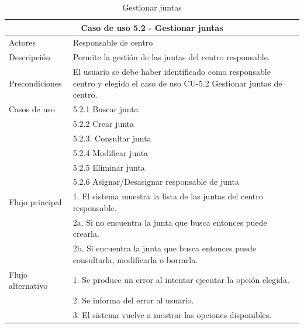 \begin{table}[H]
    \caption{Gestionar juntas}
    \label{tab:CU-5.2}
    \begin{center}
        \begin{tabular}{|l|p{12cm}|}
            \hline
            \multicolumn{2}{|c|}{Caso de uso 5.2 - Gestionar juntas} \\
            \hline \hline
            Actores                 &   Responsable de centro          \\  
            \hline
            Descripción             &   Permite la gestión de las juntas del centro responsable. \\  \hline
            Precondiciones          &   El usuario se debe haber identificado como responsable centro y elegido el caso de uso CU-5.2 Gestionar juntas de centro. \\  \hline
            Casos de uso            & 
            5.2.1 Buscar junta \\ 
            &
            5.2.2 Crear junta \\ 
            & 
            5.2.3. Consultar junta\\ 
            & 
            5.2.4 Modificar junta \\ 
            &  
            5.2.5 Eliminar junta \\ 
            &
            5.2.6 Asignar/Desasignar responsable de junta \\
            \hline
   
            Flujo principal         &   1. El sistema muestra la lista de las juntas del centro responsable.   \\ 
            & 2a. Si no encuentra la junta que busca entonces puede crearla. \\ 
            & 2b. Si encuentra la junta que busca entonces puede consultarla, modificarla o borrarla. \\ \hline
            Flujo alternativo    &   1. Se produce un error al intentar ejecutar la opción elegida.  \\ 
            & 2. Se informa del error al usuario. \\
            & 3. El sistema vuelve a mostrar las opciones disponibles. \\
            \hline
        \end{tabular}
    \end{center}
\end{table}

